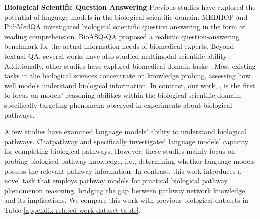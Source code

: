 \textbf{Biological Scientific Question Answering} Previous studies have explored the potential of language models in the biological scientific domain. MEDHOP \citep{welbl2018constructing} and PubMedQA \citep{jin2019pubmedqa} investigated biological scientific question answering in the form of reading comprehension. BioASQ-QA \citep{krithara2023bioasq} proposed a realistic question-answering benchmark for the actual information needs of biomedical experts. Beyond textual QA, several works have also studied multimodal scientific ability \citep{lu2022learn}. Additionally, other studies have explored biomedical domain tasks \citep{vilares2019head, jin2021disease, pal2022medmcqa}. Most existing tasks in the biological sciences concentrate on knowledge probing, assessing how well models understand biological information. In contrast, our work, \benchname, is the first to focus on models' reasoning abilities within the biological scientific domain, specifically targeting phenomena observed in experiments about biological pathways.

A few studies have examined language models' ability to understand biological pathways. Chatpathway \citep{li2023chatpathway} and \cite{azam2024comprehensive} specifically investigated language models' capacity for completing biological pathways. However, these studies mainly focus on probing biological pathway knowledge, i.e., determining whether language models possess the relevant pathway information. In contrast, this work introduces a novel task that employs pathway models for practical biological pathway phenomenon reasoning, bridging the gap between pathway network knowledge and its implications. We compare this work with previous biological datasets in Table \ref{appendix related work dataset table}.


